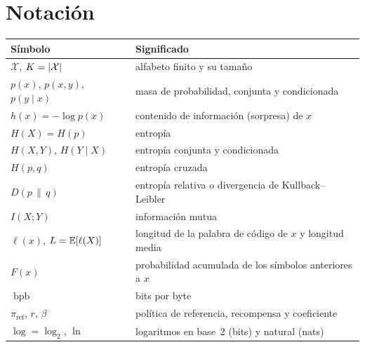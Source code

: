\documentclass[11pt,a4paper,twoside,openany]{book}
\newcommand{\KL}[2]{D(#1\,\|\,#2)}
\newcommand{\X}{\mathcal{X}}
\newcommand{\pref}{\pi_{\mathrm{ref}}}
\DeclareMathOperator{\bpb}{bpb}
\begin{document}
\section*{Notación}
\begin{center}
\begin{tabular}{@{}ll@{}}
\toprule
Símbolo & Significado \\
\midrule
$\X$, $K=\abs{\X}$ & alfabeto finito y su tamaño \\
$p(x)$, $p(x,y)$, $p(y\mid x)$ & masa de probabilidad, conjunta y condicionada \\
$h(x)=-\log p(x)$ & contenido de información (sorpresa) de $x$ \\
$H(X)=H(p)$ & entropía \\
$H(X,Y)$, $H(Y\mid X)$ & entropía conjunta y condicionada \\
$H(p,q)$ & entropía cruzada \\
$\KL{p}{q}$ & entropía relativa o divergencia de Kullback--Leibler \\
$I(X;Y)$ & información mutua \\
$\ell(x)$, $L=\mathbb{E}[\ell(X)]$ & longitud de la palabra de código de $x$ y longitud media \\
$F(x)$ & probabilidad acumulada de los símbolos anteriores a $x$ \\
$\bpb$ & bits por byte \\
$\pref$, $r$, $\beta$ & política de referencia, recompensa y coeficiente \\
$\log=\log_2$, $\ln$ & logaritmos en base~2 (bits) y natural (nats) \\
\bottomrule
\end{tabular}
\end{center}


\tableofcontents

\mainmatter






\backmatter

\end{document}

